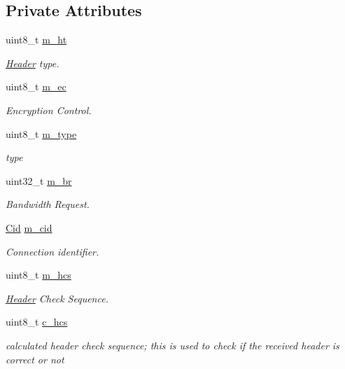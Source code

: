 \subsection*{Private Attributes}
\begin{DoxyCompactItemize}
\item 
uint8\+\_\+t \hyperlink{classns3_1_1BandwidthRequestHeader_aa3c091baf3692d41a367aead455bbe8e}{m\+\_\+ht}
\begin{DoxyCompactList}\small\item\em \hyperlink{classns3_1_1Header}{Header} type. \end{DoxyCompactList}\item 
uint8\+\_\+t \hyperlink{classns3_1_1BandwidthRequestHeader_a015f61b40a1d73ed35d84a9cbe182e86}{m\+\_\+ec}
\begin{DoxyCompactList}\small\item\em Encryption Control. \end{DoxyCompactList}\item 
uint8\+\_\+t \hyperlink{classns3_1_1BandwidthRequestHeader_acbf2b6dc3bfefc47d08cf6edc673ec97}{m\+\_\+type}
\begin{DoxyCompactList}\small\item\em type \end{DoxyCompactList}\item 
uint32\+\_\+t \hyperlink{classns3_1_1BandwidthRequestHeader_aaf45b47717a872f2cce8d64791d79cc6}{m\+\_\+br}
\begin{DoxyCompactList}\small\item\em Bandwidth Request. \end{DoxyCompactList}\item 
\hyperlink{classns3_1_1Cid}{Cid} \hyperlink{classns3_1_1BandwidthRequestHeader_aea0cd9244c65e015ca03d4139d8cef62}{m\+\_\+cid}
\begin{DoxyCompactList}\small\item\em Connection identifier. \end{DoxyCompactList}\item 
uint8\+\_\+t \hyperlink{classns3_1_1BandwidthRequestHeader_a5d7b69f1290ad7762292a556d7f1687d}{m\+\_\+hcs}
\begin{DoxyCompactList}\small\item\em \hyperlink{classns3_1_1Header}{Header} Check Sequence. \end{DoxyCompactList}\item 
uint8\+\_\+t \hyperlink{classns3_1_1BandwidthRequestHeader_a58a8219646d0c9055de4931cccdc0a95}{c\+\_\+hcs}
\begin{DoxyCompactList}\small\item\em calculated header check sequence; this is used to check if the received header is correct or not \end{DoxyCompactList}\end{DoxyCompactItemize}
